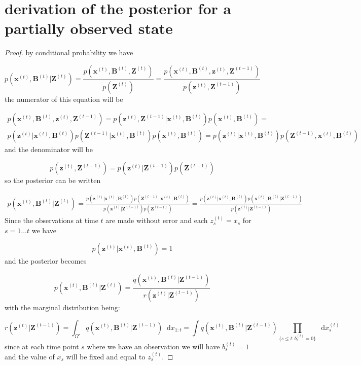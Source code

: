 \documentclass[11pt,a4paper]{article}
\renewcommand{\vec}[1]{\mathbf{#1}}
\newcommand*\diff{\mathop{}\!\mathrm{d}}
\begin{document}
\section{derivation of the posterior for a partially observed state}

\begin{proof}

by conditional probability we have

\[
p(\vec{x}^{(t)},\vec{B}^{(t)} | \vec{Z}^{(t)}) = \frac{p(\vec{x}^{(t)},\vec{B}^{(t)}, \vec{Z}^{(t)})}{p(\vec{Z}^{(t)})} = \frac{p(\vec{x}^{(t)},\vec{B}^{(t)}, \vec{z}^{(t)}, \vec{Z}^{(t-1)})}{p(\vec{z}^{(t)},\vec{Z}^{(t-1)})}
\]
the numerator of this equation will be

\begin{multline*}
p(\vec{x}^{(t)},\vec{B}^{(t)}, \vec{z}^{(t)}, \vec{Z}^{(t-1)}) = p(\vec{z}^{(t)}, \vec{Z}^{(t-1)} | \vec{x}^{(t)},\vec{B}^{(t)})p(\vec{x}^{(t)},\vec{B}^{(t)}) = \\ p(\vec{z}^{(t)} | \vec{x}^{(t)},\vec{B}^{(t)}) p(\vec{Z}^{(t-1)} | \vec{x}^{(t)},\vec{B}^{(t)})p(\vec{x}^{(t)},\vec{B}^{(t)}) = p(\vec{z}^{(t)} | \vec{x}^{(t)},\vec{B}^{(t)}) p(\vec{Z}^{(t-1)}, \vec{x}^{(t)} , \vec{B}^{(t)})
\end{multline*}
and the denominator will be

\[
p(\vec{z}^{(t)},\vec{Z}^{(t-1)}) = p(\vec{z}^{(t)} | \vec{Z}^{(t-1)}) p(\vec{Z}^{(t-1)}) 
\]
so the posterior can be written

\begin{multline*}
p(\vec{x}^{(t)},\vec{B}^{(t)} | \vec{Z}^{(t)}) = \frac{p(\vec{z}^{(t)} | \vec{x}^{(t)},\vec{B}^{(t)}) p(\vec{Z}^{(t-1)}, \vec{x}^{(t)} , \vec{B}^{(t)})}{p(\vec{z}^{(t)} | \vec{Z}^{(t-1)}) p(\vec{Z}^{(t-1)}) } = \frac{p(\vec{z}^{(t)} | \vec{x}^{(t)},\vec{B}^{(t)}) p(\vec{x}^{(t)} , \vec{B}^{(t)} | \vec{Z}^{(t-1)})}{p(\vec{z}^{(t)} | \vec{Z}^{(t-1)})}
\end{multline*}
Since the observations at time $t$ are made without error and each $z^{(t)}_s = x_s$ for $s = 1 \dots t$ we have

\[
p(\vec{z}^{(t)} | \vec{x}^{(t)}, \vec{B}^{(t)}) = 1
\]
and the posterior becomes

\[
p(\vec{x}^{(t)},\vec{B}^{(t)} | \vec{Z}^{(t)}) = \frac{q(\vec{x}^{(t)} , \vec{B}^{(t)} | \vec{Z}^{(t-1)})}{r(\vec{z}^{(t)} | \vec{Z}^{(t-1)})}
\]
with the marginal distribution being:

\[
r(\vec{z}^{(t)} | \vec{Z}^{(t-1)}) = \int_{\Omega'} q(\vec{x}^{(t)}, \vec{B}^{(t)}|\vec{Z}^{(t-1)}) \diff x_{1:t} = \int q(\vec{x}^{(t)}, \vec{B}^{(t)}|\vec{Z}^{(t-1)}) \prod_{\{s \leq t: b_s^{(t)} = 0\}} \diff x_s^{(t)}
\]
since at each time point $s$ where we have an observation we will have $b^{(t)}_s=1$ and the value of $x_s$ will be fixed and equal to $z^{(t)}_s$.

\end{proof}
\end{document}
